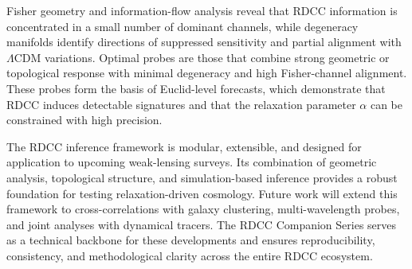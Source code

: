 \documentclass[11pt,a4paper]{article}
\begin{document}
Fisher geometry and information-flow analysis reveal that RDCC information is
concentrated in a small number of dominant channels, while degeneracy manifolds
identify directions of suppressed sensitivity and partial alignment with
$\Lambda$CDM variations. Optimal probes are those that combine strong geometric
or topological response with minimal degeneracy and high Fisher-channel
alignment. These probes form the basis of Euclid-level forecasts, which
demonstrate that RDCC induces detectable signatures and that the relaxation
parameter $\alpha$ can be constrained with high precision.

The RDCC inference framework is modular, extensible, and designed for
application to upcoming weak-lensing surveys. Its combination of geometric
analysis, topological structure, and simulation-based inference provides a robust
foundation for testing relaxation-driven cosmology. Future work will extend this
framework to cross-correlations with galaxy clustering, multi-wavelength probes,
and joint analyses with dynamical tracers. The RDCC Companion Series serves as a
technical backbone for these developments and ensures reproducibility,
consistency, and methodological clarity across the entire RDCC ecosystem.
\end{document}
